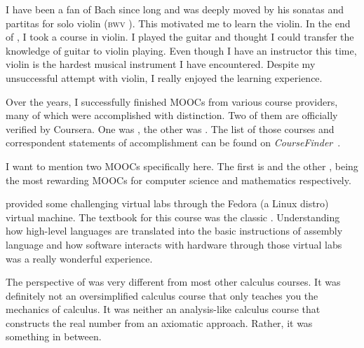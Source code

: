 	I have been a fan of Bach since long and was deeply moved by his sonatas and partitas for solo violin (\textsc{bwv} ). This motivated me to learn the violin. In the end of , I took a course in violin. I played the guitar and thought I could transfer the knowledge of guitar to violin playing. Even though I have an instructor this time, violin is the hardest musical instrument I have encountered. Despite my unsuccessful attempt with violin, I really enjoyed the learning experience.
	
	Over the years, I successfully finished  MOOCs from various course providers, many of which were accomplished with distinction. Two of them are officially verified by Coursera. One was , the other was . The list of those  courses and correspondent statements of accomplishment can be found on \textit{CourseFinder}~\cite{accredible}.
	
	I want to mention two MOOCs specifically here. The first is  and the other , being the most rewarding MOOCs for computer science and mathematics respectively.
	
	 provided some challenging virtual labs through the Fedora (a Linux distro) virtual machine. The textbook for this course was the classic . Understanding how high-level languages are translated into the basic instructions of assembly language and how software interacts with hardware through those virtual labs was a really wonderful experience.
	
	The perspective of  was very different from most other calculus courses. It was definitely not an oversimplified calculus course that only teaches you the mechanics of calculus. It was neither an analysis-like calculus course that constructs the real number from an axiomatic approach. Rather, it was something in between. 
	
